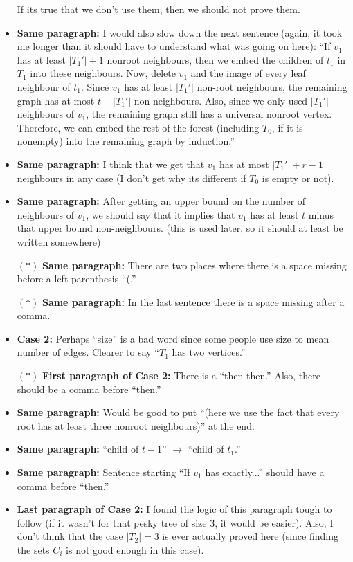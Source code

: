 \documentclass[11 pt]{article}
\begin{document}
\begin{itemize}
\begin{itemize}
\end{itemize}
If its true that we don't use them, then we should not prove them. 
\item \textbf{Same paragraph:} I would also slow down the next sentence (again, it took me longer than it should have to understand what was going on here): ``If $v_1$ has at least $|T_1'|+1$ nonroot neighbours, then we embed the children of $t_1$ in $T_1$ into these neighbours. Now, delete $v_1$ and the image of every leaf neighbour of $t_1$. Since $v_1$ has at least $|T_1'|$ non-root neighbours, the remaining graph has at most $t-|T_1'|$ non-neighbours. Also, since we only used $|T_1'|$ neighbours of $v_1$, the remaining graph still has a universal nonroot vertex. Therefore, we can embed the rest of the forest (including $T_0$, if it is nonempty) into the remaining graph by induction.''
\item \textbf{Same paragraph:} I think that we get that $v_1$ has at most $|T_1'|+r-1$ neighbours in any case (I don't get why its different if $T_0$ is empty or not). 
\item \textbf{Same paragraph:} After getting an upper bound on the number of neighbours of $v_1$, we should say that it implies that $v_1$ has at least $t$ minus that upper bound non-neighbours. (this is used later, so it should at least be written somewhere)
\item[$\boldsymbol{(*)}$] \textbf{Same paragraph:} There are two places where there is a space missing before a left parenthesis ``(.''
\item[$\boldsymbol{(*)}$] \textbf{Same paragraph:} In the last sentence there is a space missing after a comma. 
\item \textbf{Case 2:} Perhaps ``size'' is a bad word since some people use size to mean number of edges. Clearer to say ``$T_1$ has two vertices.''
\item[$\boldsymbol{(*)}$] \textbf{First paragraph of Case 2:} There is a ``then then.'' Also, there should be a comma before ``then.''
\item \textbf{Same paragraph:} Would be good to put ``(here we use the fact that every root has at least three nonroot neighbours)'' at the end.
\item \textbf{Same paragraph:} ``child of $t-1$'' $\to$ ``child of $t_1$.''
\item \textbf{Same paragraph:} Sentence starting ``If $v_1$ has exactly...'' should have a comma before ``then.''
\item \textbf{Last paragraph of Case 2:} I found the logic of this paragraph tough to follow (if it wasn't for that pesky tree of size 3, it would be easier). Also, I don't think that the case $|T_2|=3$ is ever actually proved here (since finding the sets $C_i$ is not good enough in this case). 


\end{itemize}
\end{document}
